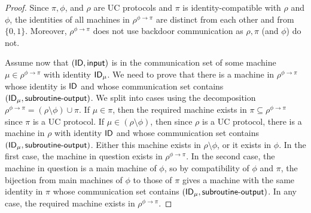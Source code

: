 \begin{proof}
Since $\pi,\phi$, and $\rho$ are UC protocols and $\pi$ is identity-compatible with $\rho$ and $\phi$, the identities of all machines in $\rho^{\phi\to\pi}$ are distinct from each other and from $\{0,1\}$. Moreover, $\rho^{\phi\to\pi}$ does not use backdoor communication as $\rho,\pi$ (and $\phi$) do not.

Assume now that $(\mathsf{ID},\mathsf{input})$ is in the communication set of some machine $\mu \in \rho^{\phi\to\pi}$ with identity $\mathsf{ID}_\mu$. We need to prove that  there is a machine in $\rho^{\phi\to\pi}$ whose identity is $\mathsf{ID}$ and whose communication set contains $(\mathsf{ID}_\mu,\mathsf{subroutine\textsf{-}output})$. We split into cases using the decomposition  $ \rho^{\phi\to\pi}=(\rho\setminus\phi)\cup\pi$. If $\mu\in\pi$, then the required machine exists in $\pi\subseteq \rho^{\phi\to\pi}$ since $\pi$ is a UC protocol.  If $\mu\in(\rho\setminus\phi)$, then since $\rho$ is a UC protocol, there is a machine in $\rho$  with identity $\mathsf{ID}$ and whose communication set contains $(\mathsf{ID}_\mu,\mathsf{subroutine\textsf{-}output})$. Either this machine exists in $\rho\setminus\phi$, or it exists in $\phi$. In the first case, the machine in question exists in $\rho^{\phi\to\pi}$. In the second case, the machine in question is a main machine of $\phi$, so by compatibility of $\phi$ and $\pi$, the bijection from main machines of $\phi$ to those of $\pi$ gives a machine with the same identity in $\pi$ whose communication set contains $(\mathsf{ID}_\mu,\mathsf{subroutine\textsf{-}output})$. In any case, the required machine exists in $\rho^{\phi\to\pi}$.


\end{proof}
